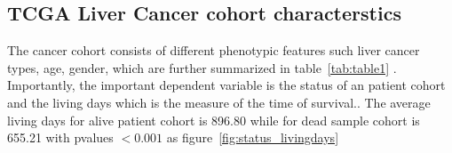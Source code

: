 \documentclass{article}
\begin{document}
 	
	
	\subsection {TCGA Liver Cancer cohort characterstics}
 
The cancer cohort consists of different phenotypic features such liver cancer types, age, gender, which are further summarized in table~\ref{tab:table1} . Importantly, the important dependent variable is the status of an patient cohort  and the  living days which is the measure of the time of survival.. The average living days for alive  patient cohort is  896.80 while for dead sample cohort is 655.21 with pvalues $< 0.001$ as figure~\ref{fig:status_livingdays}
 
 \begin{table}[h]
\centering
{}
\end{table}
\end{document}
